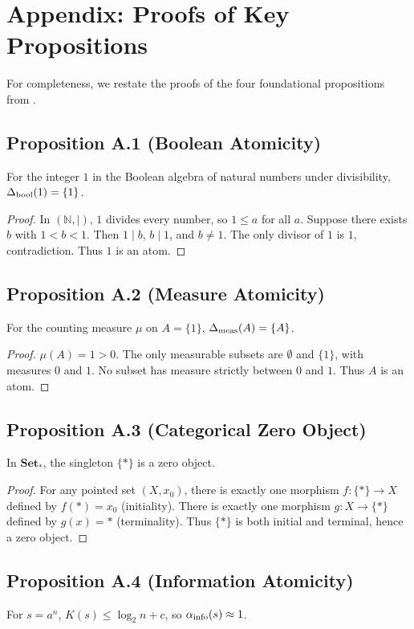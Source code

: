 \clearpage
\section{Appendix: Proofs of Key Propositions}
\label{app:proofs}

For completeness, we restate the proofs of the four foundational propositions from \cite{beniers2026apeiron}.

\subsection*{Proposition A.1 (Boolean Atomicity)}
For the integer $1$ in the Boolean algebra of natural numbers under divisibility, $\Delta_{\text{bool}}(1) = \{1\}$.

\begin{proof}
In $(\mathbb{N}, |)$, $1$ divides every number, so $1 \le a$ for all $a$. Suppose there exists $b$ with $1 < b < 1$. Then $1 \mid b$, $b \mid 1$, and $b \neq 1$. The only divisor of $1$ is $1$, contradiction. Thus $1$ is an atom.
\end{proof}

\subsection*{Proposition A.2 (Measure Atomicity)}
For the counting measure $\mu$ on $A = \{1\}$, $\Delta_{\text{meas}}(A) = \{A\}$.

\begin{proof}
$\mu(A) = 1 > 0$. The only measurable subsets are $\emptyset$ and $\{1\}$, with measures $0$ and $1$. No subset has measure strictly between $0$ and $1$. Thus $A$ is an atom.
\end{proof}

\subsection*{Proposition A.3 (Categorical Zero Object)}
In $\mathbf{Set}_*$, the singleton $\{*\}$ is a zero object.

\begin{proof}
For any pointed set $(X, x_0)$, there is exactly one morphism $f: \{*\} \to X$ defined by $f(*) = x_0$ (initiality). There is exactly one morphism $g: X \to \{*\}$ defined by $g(x) = *$ (terminality). Thus $\{*\}$ is both initial and terminal, hence a zero object.
\end{proof}

\subsection*{Proposition A.4 (Information Atomicity)}
For $s = a^n$, $K(s) \le \log_2 n + c$, so $\alpha_{\text{info}}(s) \approx 1$.


